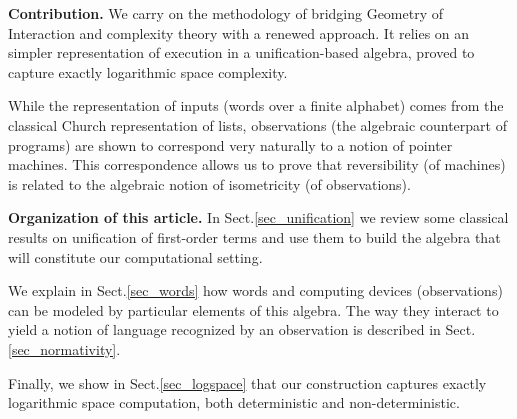 

\smallskip

\bigskip\noindent
\textbf{Contribution.}
We carry on the methodology of bridging Geometry of Interaction and complexity theory with a renewed approach.
It relies on an simpler representation of execution in a unification-based algebra, proved to capture exactly logarithmic space complexity.

While the representation of inputs (words over a finite alphabet) comes from the classical Church representation of lists, observations (the algebraic counterpart of programs) are shown to correspond  very naturally to a notion of pointer machines.
This correspondence allows us to prove that reversibility (of machines) is related to the algebraic notion of isometricity (of observations).




\smallskip\noindent
\textbf{Organization of this article.} In Sect.\ref{sec_unification} we review some classical results on unification of first-order terms and use them to build the algebra that will constitute our computational setting.

We explain in Sect.\ref{sec_words} how words and computing devices (observations) can be modeled by particular elements of this algebra.
The way they interact to yield a notion of language recognized by an observation is described in Sect.\ref{sec_normativity}.

Finally, we show in Sect.\ref{sec_logspace} that our construction captures exactly logarithmic space computation, both deterministic and non-deterministic.

\vspace{-2mm}

